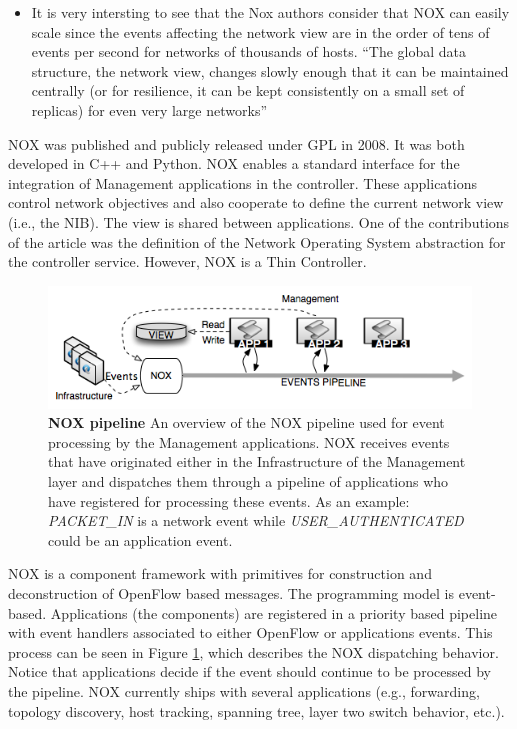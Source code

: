 \begin{itemize}
\begin{itemize}
\item It is very intersting to see that the Nox authors consider that NOX can easily scale since the events affecting the network view are in the order of tens of events per second for networks of thousands of hosts. ``The global data structure, the network view, changes slowly enough that it can be maintained centrally (or for resilience, it can be kept consistently on a small set of replicas) for even very large networks'' 
\end{itemize}


NOX \cite{Gude:2008jd}  was published and publicly released under
GPL in 2008. It was both developed in C++ and Python. NOX enables a standard interface for the integration of  Management applications 
in the controller. These applications control
network objectives and also cooperate to define the current
network view (i.e., the NIB). The view is shared between applications. One of the
contributions of the article was the definition of the Network
Operating System abstraction for the controller service. However, NOX
is a Thin Controller. 

\begin{figure}
  \centering 
  \footnotesize
  \includegraphics[scale=0.5]{pic/nox-pipeline}
  \caption[NOX pipeline] {\textbf{NOX pipeline} An overview of the NOX
    pipeline used for event processing by the Management applications. NOX
  receives events that have originated either in the Infrastructure of
the Management layer and dispatches them through a pipeline of
applications who have registered for processing these events. 
 As an example: \emph{PACKET\_IN} is a network event while
\emph{USER\_AUTHENTICATED} could be an application event.}
  \label{fig:nox-pipeline}
\end{figure}

NOX is a component framework with primitives for
construction and deconstruction of OpenFlow
based messages. The programming model is event-based. Applications (the components) are registered in a
priority based pipeline with event handlers associated to either
OpenFlow or applications events. This process can be seen in Figure
\ref{fig:nox-pipeline}, which describes the NOX dispatching behavior. Notice
that applications decide if the event should continue to be processed
by the pipeline. NOX  currently ships
with several applications (e.g., forwarding, topology discovery, host
tracking, spanning tree, layer two switch behavior, etc.).


\end{itemize}
